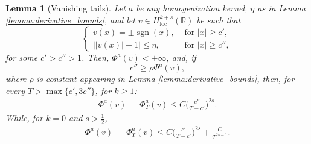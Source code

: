 \documentclass{article}
\newtheorem{Lemma}[Theorem]{Lemma}
\theoremstyle{definition}
\newcommand{\R}{\mathbb{R}}
\begin{document}
\begin{Lemma}[Vanishing tails] \label{lemma:vanishing_tails} 
Let $a$ be any homogenization kernel, $\eta$ as in Lemma \ref{lemma:derivative_bounds}, and let $v\in H^{k+s}_{\mathrm{loc}}(\R)$ be such that 
\begin{equation*}
\begin{cases}
    v(x)=\pm \operatorname{sgn}(x), &\text{ for } |x|\geq c',\\
    \big||v(x)|-1\big|\leq \eta, &\text{ for } |x|\geq c'',
\end{cases}
\end{equation*}
for some $c'>c''>1$. Then, $\Phi^a(v)<+\infty$, and, if \[c''\geq  \rho \Phi^a(v),\] where $\rho$ is constant appearing in Lemma \ref{lemma:derivative_bounds}, then, for every $T> \max\{c',3c''\}$, for $k\geq 1$:
\begin{align*}
    \Phi^a(v)&-\Phi^a_T(v) \leq C\Big(\frac{c''}{T-c'}\Big)^{2s}.
\end{align*}
    {
    While, for $k=0$ and $s>\frac{1}{2}$,
    \begin{align*}
       \Phi^a(v)&-\Phi^a_T(v) \leq C\Big(\frac{c'}{T-c'}\Big)^{2s} + \frac{C}{T^{2s-1}}. 
    \end{align*}
    }
   
\end{Lemma}
\end{document}
